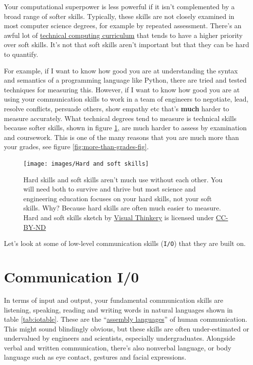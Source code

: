 \documentclass[
]{book}
\begin{document}
Your computational superpower is less powerful if it isn't complemented by a broad range of softer skills. Typically, these skills are not closely examined in most computer science degrees, for example by repeated assessment. There's an awful lot of \href{https://www.acm.org/education/curricula-recommendations}{technical computing curriculum} that tends to have a higher priority over soft skills. It's not that soft skills aren't important but that they can be hard to quantify.

For example, if I want to know how good you are at understanding the syntax and semantics of a programming language like Python, there are tried and tested techniques for measuring this. However, if I want to know how good you are at using your communication skills to work in a team of engineers to negotiate, lead, resolve conflicts, persuade others, show empathy etc that's \textbf{much} harder to measure accurately. What technical degrees tend to measure is technical skills because softer skills, shown in figure \ref{fig:allskills-fig}, are much harder to assess by examination and coursework. This is one of the many reasons that you are much more than your grades, see figure \ref{fig:more-than-grades-fig}.

\begin{figure}

{\centering \texttt{[image: images/Hard and soft skills]} 

}

\caption{Hard skills and soft skills aren't much use without each other. You will need both to survive and thrive but most science and engineering education focuses on your hard skills, not your soft skills. Why? Because hard skills are often much easier to measure. Hard and soft skills sketch by \href{https://visualthinkery.com/}{Visual Thinkery} is licensed under \href{https://creativecommons.org/licenses/by-nd/4.0/}{CC-BY-ND}}\label{fig:allskills-fig}
\end{figure}



Let's look at some of low-level communication skills (\texttt{I/O}) that they are built on.

\hypertarget{cio}{%
\section{Communication I/0}\label{cio}}

In terms of input and output, your fundamental communication skills are listening, speaking, reading and writing words in natural languages shown in table \ref{tab:iotable}. These are the ``\href{https://en.wikipedia.org/wiki/Assembly_language}{assembly languages}'' of human communication. This might sound blindingly obvious, but these skills are often under-estimated or undervalued by engineers and scientists, especially undergraduates. Alongside verbal and written communication, there's also nonverbal language, or body language such as eye contact, gestures and facial expressions.
\end{document}
